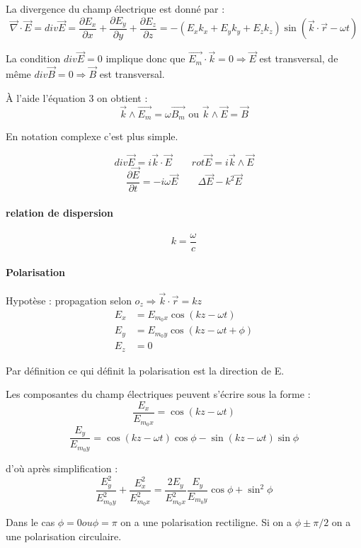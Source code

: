 \documentclass[12pt,a4paper]{report}
\begin{document}
La divergence du champ électrique est donné par :
\[
	\vec{\nabla} \cdot \vec{E} = div \vec{E} = \dfrac{\partial E_x}{\partial x} + \dfrac{\partial E_y}{\partial y} + \dfrac{\partial E_z}{\partial z} = -(E_x k_x + E_y k_y + E_z k_z) \sin(\vec{k} \cdot \vec{r} - \omega t)
\]

La condition \(div \vec{E} = 0\) implique donc que \(\vec{E_m} \cdot \vec{k} = 0 \Rightarrow \vec{E}\) est transversal, de même \(div \vec{B} = 0 \Rightarrow \vec{B}\) est transversal.

À l'aide l'équation 3 on obtient :
\[
	\vec{k} \wedge \vec{E_m} = \omega \vec{B_m} \text{ ou } \vec{k} \wedge \vec{E} = \vec{B} 
\]

En notation complexe c'est plus simple.

\[
	div \vec{E} = i\vec{k} \cdot \vec{E} \quad \quad rot \vec{E} = i\vec{k} \wedge \vec{E}
\]
\[
	\dfrac{\partial \vec{E}}{\partial t} = -i \omega \vec{E} \quad \quad \Delta \vec{E} - k^2 \vec{E}
\]

\paragraph{relation de dispersion}

\[
	k = \dfrac{\omega}{c}
\]

\paragraph{Polarisation}

Hypotèse : propagation selon \(o_z \Rightarrow \vec{k}\cdot \vec{r} = kz\)
\begin{align*}
	E_x &= E_{m_0x} \cos (kz - \omega t)\\
	E_y &= E_{m_0y} \cos (kz - \omega t + \phi)\\
	E_z &= 0
\end{align*}

Par définition ce qui définit la polarisation est la direction de E.

Les composantes du champ électriques peuvent s'écrire sous la forme :
\[
	\dfrac{E_x}{E_{m_0x}} = \cos (kz - \omega t)
\]
\[
	\dfrac{E_y}{E_{m_0y}} = \cos (kz - \omega t) \cos \phi -\sin (kz - \omega t) \sin \phi
\]

d'où après simplification : 
\[
	\dfrac{E_y^2}{E^2_{m_0y}} + \dfrac{E_x^2}{E^2_{m_0x}} = \dfrac{2 E_y}{E^2_{m_0x}} \dfrac{E_y}{E_{m_0y}}\cos \phi + \sin^2 \phi
\]

Dans le cas \(\phi = 0 ou \phi = \pi\) on a une polarisation rectiligne.
Si on a \(\phi \pm \pi/2\) on a une polarisation circulaire.
\end{document}

